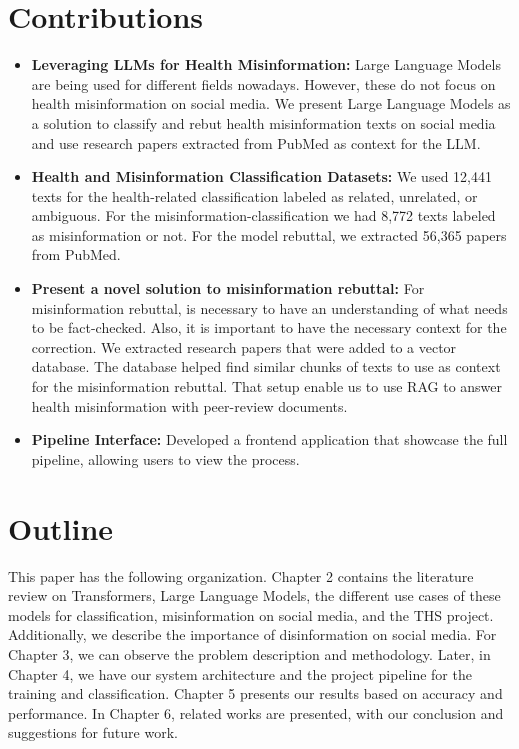\section{Contributions}
\noindent
\begin{itemize}
	\item \textbf{Leveraging LLMs for Health Misinformation:} Large Language Models are being used for different fields nowadays. However, these do not focus on health misinformation on social media. We present Large Language Models as a solution
	to classify and rebut health misinformation texts on social media and use research papers extracted from PubMed as context for the LLM.
	\item \textbf{Health and Misinformation Classification Datasets:} We used 12,441 texts for the health-related classification labeled as related, unrelated, or ambiguous. For the misinformation-classification we had 8,772 texts labeled as misinformation or not. For the model rebuttal, we extracted
	56,365 papers from PubMed.
	\item \textbf{Present a novel solution to misinformation rebuttal:} For misinformation rebuttal, is necessary to have an understanding of what needs to be fact-checked. Also, it is important to have the necessary context for the correction. We extracted research papers that were added to a
	vector database. The database helped find similar chunks of texts to use as context for the misinformation rebuttal. That setup enable us to use RAG to answer health misinformation with peer-review documents.
	\item \textbf{Pipeline Interface:} Developed a frontend application that showcase the full pipeline, allowing users to view the process.
	
\end{itemize}

\section{Outline}
\noindent
This paper has the following organization. Chapter 2 contains the literature review on Transformers, Large Language Models,
the different use cases of these models for classification, misinformation on social media, and the THS project. Additionally, we describe the
importance of disinformation on social media. For Chapter 3, we can observe the problem description and methodology.
 Later, in Chapter 4, we have our system architecture and the project pipeline for the training and classification. Chapter 5 presents our results based on accuracy and performance. In Chapter 6, related works are presented, with our conclusion and suggestions for future work.
 
 
 
 
 